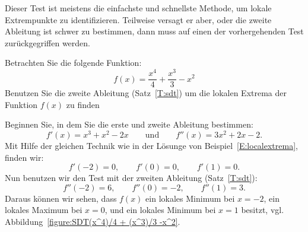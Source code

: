Dieser Test ist meistens die einfachste und schnellste Methode, um lokale Extrempunkte zu identifizieren. Teilweise versagt er aber, oder die zweite Ableitung ist schwer zu bestimmen, dann muss auf einen der vorhergehenden Test zurückgegriffen werden.


\begin{example}
Betrachten Sie die folgende Funktion:
\[
f(x) = \frac{x^4}{4}+\frac{x^3}{3}-x^2
\]
Benutzen Sie die zweite Ableitung (Satz~\ref{T:sdt}) um die lokalen Extrema der Funktion $f(x)$ zu finden
\end{example}

\begin{solution}
Beginnen Sie, in dem Sie die erste und zweite Ableitung bestimmen:
\[
f'(x) = x^3 + x^2 -2x \qquad\text{und}\qquad f''(x) = 3x^2 + 2x-2.
\] 
Mit Hilfe der gleichen Technik wie in der Lösunge von Beispiel~\ref{E:localextrema}, finden wir:
\[
f'(-2) = 0,\qquad f'(0) = 0, \qquad f'(1) = 0. 
\]
Nun benutzen wir den Test mit der zweiten Ableitung (Satz~\ref{T:sdt}):
\[
f''(-2) = 6, \qquad f''(0) = -2, \qquad f''(1) = 3.
\]
Daraus können wir sehen, dass $f(x)$ ein lokales Minimum bei $x=-2$, ein lokales Maximum bei $x=0$, und ein lokales Minimum bei $x=1$ besitzt, vgl. Abbildung~\ref{figure:SDT(x^4)/4 + (x^3)/3 -x^2}.
\end{solution}
